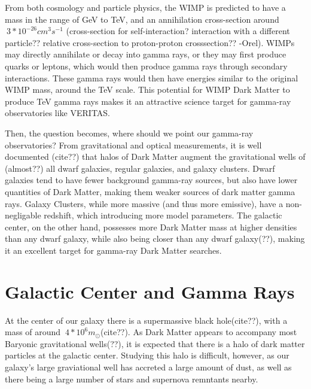 From both cosmology and particle physics, the WIMP is predicted to have a mass in the range of GeV to TeV, and an annihilation cross-section around $~3*10^{-26} cm^{3}s^{-1}$ (cross-section for self-interaction? interaction with a different particle?? relative cross-section to proton-proton crosssection?? -Orel).
WIMPs may directly annihilate or decay into gamma rays, or they may first produce quarks or leptons, which would then produce gamma rays through secondary interactions.
These gamma rays would then have energies similar to the original WIMP mass, around the TeV scale.
This potential for WIMP Dark Matter to produce TeV gamma rays makes it an attractive science target for gamma-ray observatories like VERITAS.

Then, the question becomes, where should we point our gamma-ray observatories?
From gravitational and optical measurements, it is well documented (cite??) that halos of Dark Matter augment the gravitational wells of (almost??) all dwarf galaxies, regular galaxies, and galaxy clusters.
Dwarf galaxies tend to have fewer background gamma-ray sources, but also have lower quantities of Dark Matter, making them weaker sources of dark matter gamma rays.
Galaxy Clusters, while more massive (and thus more emissive), have a non-negligable redshift, which introducing more model parameters.
The galactic center, on the other hand, possesses more Dark Matter mass at higher densities than any dwarf galaxy, while also being closer than any dwarf galaxy(??), making it an excellent target for gamma-ray Dark Matter searches.


\section{Galactic Center and Gamma Rays}

At the center of our galaxy there is a supermassive black hole(cite??), with a mass of around $~4*10^6m_{\odot}$(cite??).
As Dark Matter appears to accompany most Baryonic gravitational wells(??), it is expected that there is a halo of dark matter particles at the galactic center.
Studying this halo is difficult, however, as our galaxy's large graviational well has accreted a large amount of dust, as well as there being a large number of stars and supernova remntants nearby.

